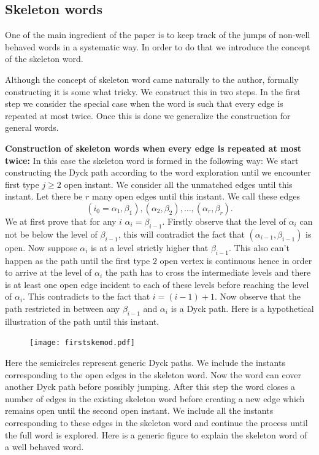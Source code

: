 \documentclass[12pt]{article}
\numberwithin{equation}{section}
\numberwithin{equation}{section}
\theoremstyle{definition}
\renewcommand{\1}{\bf 1}
\begin{document}
\subsection{Skeleton words}
One of the main ingredient of the paper is to keep track of the jumps of  non-well behaved words in a systematic way. In order to do that we introduce the concept of the skeleton word.

\noindent
Although the concept of skeleton word came naturally to the author, formally constructing it is some what tricky. We construct this in two steps. In the first step we consider the special case when the word is such that every edge is repeated at most twice. Once this is done we generalize the construction for general words. 

\noindent
\textbf{Construction of skeleton words when every edge is repeated at most twice:}
In this case the skeleton word is formed in the following way: We start constructing the Dyck path according to the word exploration until we encounter first type $j \ge 2$ open instant. We consider all the unmatched edges until this instant. Let there be $r$ many open edges until this instant. We call these edges $$(i_{0}=\alpha_{1},\beta_{1}),(\alpha_{2},\beta_{2}),\ldots, (\alpha_{r},\beta_{r}).$$ We at first prove that for any $i$ $\alpha_{i}=\beta_{i-1}$. Firstly observe that the level of $\alpha_{i}$ can not be below the level of $\beta_{i-1}$, this will contradict the fact that $(\alpha_{i-1},\beta_{i-1})$ is open. Now suppose $\alpha_{i}$ is at a level strictly higher that $\beta_{i-1}$. This also can't happen as the path until the first type $2$ open vertex is continuous hence in order to arrive at the level of $\alpha_{i}$ the path has to cross the intermediate levels and there is at least one open edge incident to each of these levels before reaching the level of $\alpha_{i}$. This contradicts to the fact that $i=(i-1)+1$. Now observe that the path restricted in between any $\beta_{i-1}$ and $\alpha_{i}$ is a Dyck path. Here is a hypothetical illustration of the path until this instant. 
\begin{figure}[H]
        \begin{center}
                \texttt{[image: firstskemod.pdf]}
        ~ %
      \end{center}   
 \end{figure} 
Here the semicircles represent generic Dyck paths. We include the instants corresponding to the open edges in the skeleton word. Now the word can cover another Dyck path before possibly jumping. After this step the word closes a number of edges in the existing skeleton word before creating a new edge which remains open until the second open instant. We include all the instants corresponding to these edges in the skeleton word and continue the process until the full word is explored. Here is a generic figure to explain the skeleton word of a well behaved word.
\end{document}

